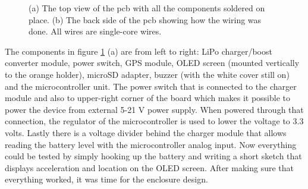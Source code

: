 \documentclass[a4paper,11pt]{article} %
\begin{document}
\begin{figure}[H]
    \hfill
    \hfill
    \hfill
    \caption{(a) The top view of the pcb with all the components soldered on place. (b) The back side of the pcb showing how the wiring was done. All wires are single-core wires.}
    \label{fig:pcb_plain}
\end{figure}

The components in figure \ref{fig:pcb_plain} (a) are from left to right: LiPo charger/boost converter module, power switch, GPS module, OLED screen (mounted vertically to the orange holder), microSD adapter, buzzer (with the white cover still on) and the microcontroller unit. The power switch that is connected to the charger module and also to upper-right corner of the board which makes it possible to power the device from external 5-21 V power supply. When powered through that connection, the regulator of the microcontroller is used to lower the voltage to 3.3 volts. Lastly there is a voltage divider behind the charger module that allows reading the battery level with the microcontroller analog input. Now everything could be tested by simply hooking up the battery and writing a short sketch that displays acceleration and location on the OLED screen. After making sure that everything worked, it was time for the enclosure design.
\end{document}
